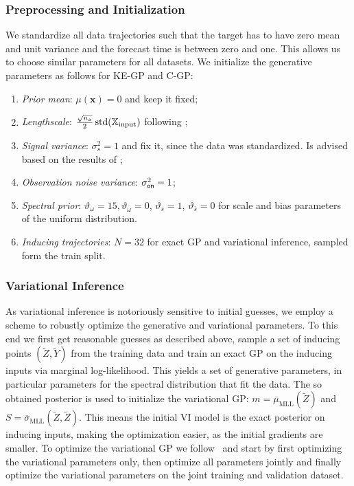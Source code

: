 \subsubsection{Preprocessing and Initialization}
We standardize all data trajectories such that the target has to have zero mean and unit variance and the forecast time is between zero and one. This allows us to choose similar parameters for all datasets. We initialize the generative parameters as follows for KE-GP and C-GP:
\begin{enumerate}[leftmargin=*,label=\txt{init}.\roman*)]
    \item \textit{Prior mean}: $\mu(\bm{x})=0$ and keep it fixed;
    \item \textit{Lengthscale}: $\frac{\sqrt{n_x}}{2}\operatorname{std} (\mathbb{X}_{\textnormal{input}})$ following \cite{pmlr-vanillaBOgreat-hvarfner24a};
    \item \textit{Signal variance}: $\sigma_{s}^2=1$ and fix it, since the data was standardized. Is advised based on the results of \cite{pmlr-vanillaBOgreat-hvarfner24a};
    \item \textit{Observation noise variance}: $\sigma_{{\textsf{on}}}^2=1$;
    \item\label{itm:SpecPrio} \textit{Spectral prior}:  $\vartheta_{{\omega}}=15, \vartheta_{\overline{\omega}}=0$, $\vartheta_{s}=1$, $\vartheta_{\overline{s}}=0$ for scale and bias parameters of the uniform distribution.
    \item \textit{Inducing trajectories}: $N{=}32$ for exact GP and variational inference, sampled form the train split.
\end{enumerate}

\subsubsection{Variational Inference}
As variational inference is notoriously sensitive to initial guesses, we employ a scheme to robustly optimize the generative and variational parameters.
To this end we first get reasonable guesses as described above, sample a set of inducing points $(\tilde{Z}, \tilde{Y})$ from the training data and train an exact GP on the inducing inputs via marginal log-likelihood. This yields a set of generative parameters, in particular parameters for the spectral distribution that fit the data. The so obtained posterior is used to initialize the variational GP: $m = \overline{\mu}_{\text{MLL}}(\tilde{Z})$ and $S = \overline{\sigma}_{\text{MLL}}(\tilde{Z}, \tilde{Z})$. This means the initial VI model is the exact posterior on inducing inputs, making the optimization easier, as the initial gradients are smaller. To optimize the variational GP we follow~\cite{Toth20a} and start by first optimizing the variational parameters only, then optimize all parameters jointly and finally optimize the variational parameters on the joint training and validation dataset.


